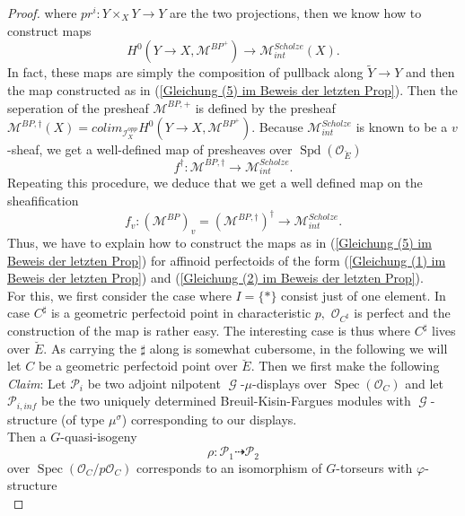 \documentclass[a4paper,10,5 pt]{amsart}
\theoremstyle{definition}
\DeclareMathOperator{\Spec}{Spec}
\DeclareMathOperator{\Spd}{Spd}
\DeclareMathOperator{\G}{\mathcal{G}}
\begin{document}
\begin{proof}
 where $pr^{i}\colon Y\times_{X} Y\rightarrow Y$ are the two projections, then we know how to construct maps
 $$
H^{0}(Y\rightarrow X,\mathcal{M}^{BP}^{+})\rightarrow \mathcal{M}^{Scholze}_{int}(X).
 $$
 In fact, these maps are simply the composition of pullback along $\tilde{Y}\rightarrow Y$ and then the map constructed as in (\ref{Gleichung (5) im Beweis der letzten Prop}). Then the seperation of the presheaf $\mathcal{M}^{BP,+}$ is defined by the presheaf $\mathcal{M}^{BP,\dagger}(X)=colim_{\mathcal{I}^{opp}_{X}}H^{0}(Y\rightarrow X,\mathcal{M}^{BP}^{+}).$ Because $\mathcal{M}^{Scholze}_{int}$ is known to be a $v$-sheaf, we get a well-defined map of presheaves over $\Spd(\mathcal{O}_{\breve{E}})$
$$
f^{\dagger}\colon \mathcal{M}^{BP,\dagger}\rightarrow \mathcal{M}^{Scholze}_{int}.
$$
Repeating this procedure, we deduce that we get a well defined map on the sheafification $$f_{v}\colon (\mathcal{M}^{BP})_{v}=(\mathcal{M}^{BP,\dagger})^{\dagger}\rightarrow \mathcal{M}^{Scholze}_{int}.$$
Thus, we have to explain how to construct the maps as in (\ref{Gleichung (5) im Beweis der letzten Prop}) for affinoid perfectoids of the form (\ref{Gleichung (1) im Beweis der letzten Prop}) and (\ref{Gleichung (2) im Beweis der letzten Prop}).
\\
For this, we first consider the case where $I=\lbrace \ast \rbrace$ consist just of one element. In case $C^{\sharp}$ is a geometric perfectoid point in characteristic $p,$ $\mathcal{O}_{C^{\sharp}}$ is perfect and the construction of the map is rather easy. The interesting case is thus where $C^{\sharp}$ lives over $\breve{E}.$ As carrying the $\sharp$ along is somewhat cubersome, in the following we will let $C$ be a geometric perfectoid point over $\breve{E}.$ Then we first make the following
\\
\textit{Claim}: Let $\mathcal{P}_{i}$ be two adjoint nilpotent $\G$-$\mu$-displays over $\Spec(\mathcal{O}_{C})$ and let $\mathcal{P}_{i,inf}$ be the two uniquely determined Breuil-Kisin-Fargues modules with $\G$-structure (of type $\mu^{\sigma}$) corresponding to our displays.
\\
Then a $G$-quasi-isogeny
\begin{equation}\label{Gleichung Quis im Claim zur Ubersetzung uber einem geom perf Punkt}
\rho\colon \mathcal{P}_{1}\dashrightarrow \mathcal{P}_{2}
\end{equation}
over $\Spec(\mathcal{O}_{C}/p\mathcal{O}_{C})$ corresponds to an isomorphism of $G$-torseurs with $\varphi$-structure
\begin{equation}\label{Gleichung kristl Quis im Claim zur Ubersetzung uber einem geo perf Punkt}

\end{equation}
\end{proof}
\end{document}
